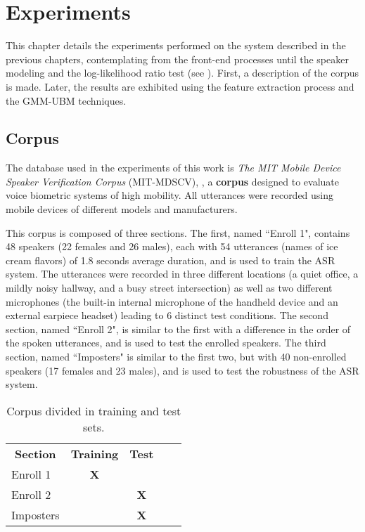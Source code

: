 \chapter{Experiments}
\label{ch:experiments}

This chapter details the experiments performed on the system described in the previous chapters, contemplating from the front-end processes until the speaker modeling and the log-likelihood ratio test (see ). First, a description of the corpus is made. Later, the results are exhibited using the feature extraction process and the GMM-UBM techniques.

\section{Corpus}
\label{sec:corpus}

The database used in the experiments of this work is \emph{The MIT Mobile Device Speaker Verification Corpus} (MIT-MDSCV), , a \textbf{corpus} designed to evaluate voice biometric systems of high mobility. All utterances were recorded using mobile devices of different models and manufacturers.

This corpus is composed of three sections. The first, named ``Enroll 1", contains 48 speakers (22 females and 26 males), each with 54 utterances (names of ice cream flavors) of 1.8 seconds average duration, and is used to train the ASR system. The utterances were recorded in three different locations (a quiet office, a mildly noisy hallway, and a busy street intersection) as well as two different microphones (the built-in internal microphone of the handheld device and an external earpiece headset) leading to 6 distinct test conditions. The second section, named ``Enroll 2", is similar to the first with a difference in the order of the spoken utterances, and is used to test the enrolled speakers. The third section, named ``Imposters" is similar to the first two, but with 40 non-enrolled speakers (17 females and 23 males), and is used to test the robustness of the ASR system.

\begin{table}[h]
    \centering
    \begin{tabular}{|l|c|c|ll}
        \cline{1-3}
        \multicolumn{1}{|c|}{\textbf{Section}} & \textbf{Training} & \textbf{Test} &  &  \\ \cline{1-3}
        Enroll 1 & \textbf{X} & \textbf{} &  &  \\ \cline{1-3}
        Enroll 2 & \textbf{} & \textbf{X} &  &  \\ \cline{1-3}
        Imposters & \textbf{} & \textbf{X} &  &  \\ \cline{1-3}
    \end{tabular}
    \caption{Corpus divided in training and test sets.}
    \label{tab:corpus-division}
\end{table}

